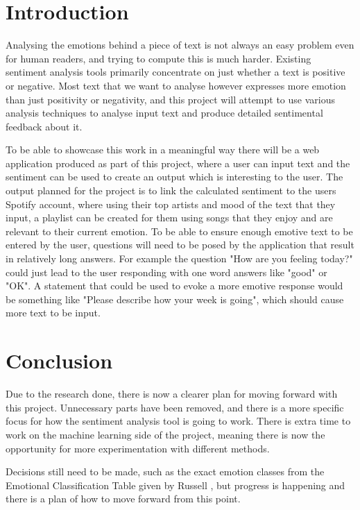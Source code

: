 
\section{Introduction}
Analysing the emotions behind a piece of text is not always an easy problem even for human readers, and trying to compute this is much harder. 
Existing sentiment analysis tools primarily concentrate on just whether a text is positive or negative. \cite{kolchyna2015twitter}
Most text that we want to analyse however expresses more emotion than just positivity or negativity, and this project will attempt to use various analysis techniques to analyse input text and produce detailed sentimental feedback about it.

To be able to showcase this work in a meaningful way there will be a web application produced as part of this project, where a user can input text and the sentiment can be used to create an output which is interesting to the user. 
The output planned for the project is to link the calculated sentiment to the users Spotify account, where using their top artists and mood of the text that they input, a playlist can be created for them using songs that they enjoy and are relevant to their current emotion.
To be able to ensure enough emotive text to be entered by the user, questions will need to be posed by the application that result in relatively long answers. For example the question "How are you feeling today?" could just lead to the user responding with one word answers like "good" or "OK". A statement that could be used to evoke a more emotive response would be something like "Please describe how your week is going", which should cause more text to be input.










\section{Conclusion}
Due to the research done, there is now a clearer plan for moving forward with this project. Unnecessary parts have been removed, and there is a more specific focus for how the sentiment analysis tool is going to work. 
There is extra time to work on the machine learning side of the project, meaning there is now the opportunity for more experimentation with different methods.

Decisions still need to be made, such as the exact emotion classes from the Emotional Classification Table given by Russell \cite{VADMapping}, but progress is happening and there is a plan of how to move forward from this point.